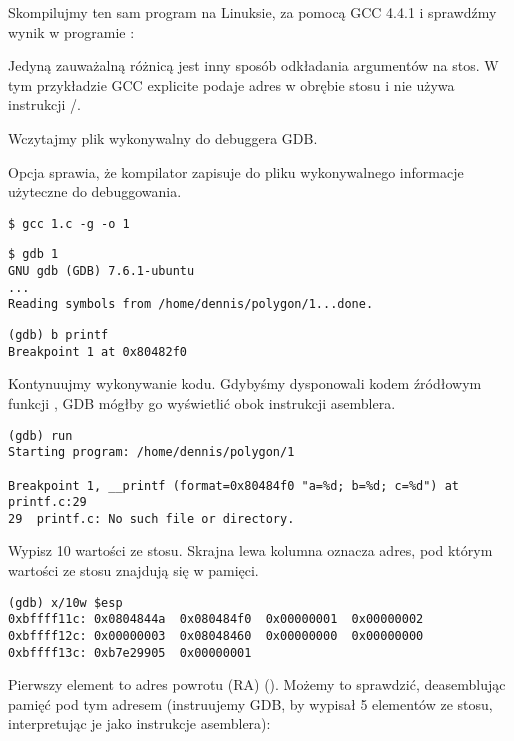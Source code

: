 
Skompilujmy ten sam program na Linuksie, za pomocą GCC 4.4.1 i sprawdźmy wynik w programie \IDA:



Jedyną zauważalną różnicą jest inny sposób odkładania argumentów na stos.
W tym przykładzie GCC explicite podaje adres w obrębie stosu i nie używa instrukcji \PUSH/\POP.


Wczytajmy plik wykonywalny do debuggera \ac{GDB}.

Opcja  sprawia, że kompilator zapisuje do pliku wykonywalnego informacje użyteczne do debuggowania.

\begin{lstlisting}
$ gcc 1.c -g -o 1
\end{lstlisting}

\begin{lstlisting}
$ gdb 1
GNU gdb (GDB) 7.6.1-ubuntu
...
Reading symbols from /home/dennis/polygon/1...done.
\end{lstlisting}

\begin{lstlisting}[caption=Ustawmy breakpoint w funkcji \printf]
(gdb) b printf
Breakpoint 1 at 0x80482f0
\end{lstlisting}

Kontynuujmy wykonywanie kodu.
Gdybyśmy dysponowali kodem źródłowym funkcji \printf, \ac{GDB} mógłby go wyświetlić obok instrukcji asemblera.

\begin{lstlisting}
(gdb) run
Starting program: /home/dennis/polygon/1

Breakpoint 1, __printf (format=0x80484f0 "a=%d; b=%d; c=%d") at printf.c:29
29	printf.c: No such file or directory.
\end{lstlisting}

Wypisz 10 wartości ze stosu. Skrajna lewa kolumna oznacza adres, pod którym wartości ze stosu znajdują się w pamięci.

\begin{lstlisting}
(gdb) x/10w $esp
0xbffff11c:	0x0804844a	0x080484f0	0x00000001	0x00000002
0xbffff12c:	0x00000003	0x08048460	0x00000000	0x00000000
0xbffff13c:	0xb7e29905	0x00000001
\end{lstlisting}

Pierwszy element to adres powrotu (\ac{RA}) ().
Możemy to sprawdzić, deasemblując pamięć pod tym adresem (instruujemy GDB, by wypisał 5 elementów ze stosu, interpretując je jako instrukcje asemblera):

